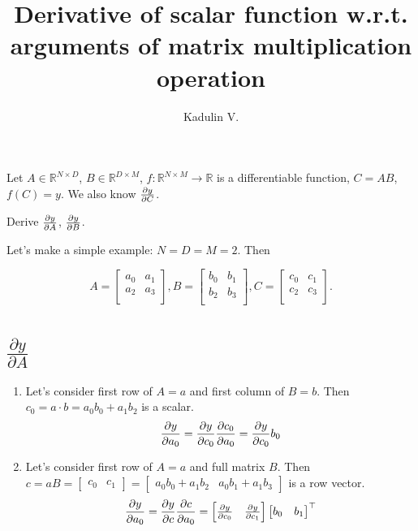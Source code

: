 \documentclass[12pt]{article}
\begin{document}
\title{Derivative of scalar function w.r.t. arguments of matrix multiplication operation}
\author{Kadulin V.}
\maketitle

Let $A \in \mathbb{R}^{N \times D}$, $B \in \mathbb{R}^{D \times M}$, 
$f: \mathbb{R}^{N \times M} \rightarrow \mathbb{R}$ is a differentiable function, $C = AB$, $f(C) = y$. We also know $\pdv{y}{C}$. 

Derive $\pdv{y}{A}$, $\pdv{y}{B}$.

Let's make a simple example: $N = D = M = 2$. Then

\[
	A = 
	\begin{bmatrix} 
		a_0 & a_1 \\
		a_2 & a_3 \\
	\end{bmatrix},
	B = 
	\begin{bmatrix} 
		b_0 & b_1 \\
		b_2 & b_3 \\
	\end{bmatrix},
	C = 
	\begin{bmatrix} 
		c_0 & c_1 \\
		c_2 & c_3 \\
	\end{bmatrix}.
\]

\section{$\frac{\partial y}{\partial A}$}

\begin{enumerate}
\item Let's consider first row of $A = a$ and first column of $B = b$.  
Then $c_0 = a \cdot b = a_0b_0 + a_1b_2$ is a scalar.  
\[
	\pdv{y}{a_0} = 
	\pdv{y}{c_0} \pdv{c_0}{a_0} = 
	\pdv{y}{c_0} b_0
\]
\item Let's consider first row of $A = a$ and full matrix $B$.  
Then $
c = aB = 
\begin{bmatrix}c_0 & c_1\end{bmatrix} =
\begin{bmatrix}a_0b_0 + a_1b_2 & a_0b_1 + a_1b_3\end{bmatrix} 
$ is a row vector.  
\[
	\pdv{y}{a_0} = 
	\pdv{y}{c} \pdv{c}{a_0} = 
	\begin{bmatrix}
		\pdv{y}{c_0} & \pdv{y}{c_1}
	\end{bmatrix} 
	\begin{bmatrix} 
		b_0 & b_1
	\end{bmatrix} ^\top
\]
\end{enumerate}
\end{document}
